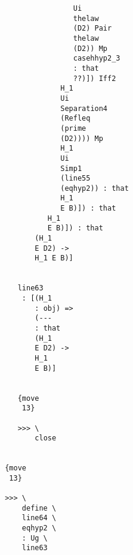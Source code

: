 \documentclass[12pt]{article}
\begin{document}
\begin{verbatim}
                                                       Ui 
                                                       thelaw 
                                                       (D2) Pair 
                                                       thelaw 
                                                       (D2)) Mp 
                                                       casehhyp2_3 
                                                       : that 
                                                       ??)]) Iff2 
                                                    H_1 
                                                    Ui 
                                                    Separation4 
                                                    (Refleq 
                                                    (prime 
                                                    (D2)))) Mp 
                                                    H_1 
                                                    Ui 
                                                    Simp1 
                                                    (line55 
                                                    (eqhyp2)) : that 
                                                    H_1 
                                                    E B)]) : that 
                                                 H_1 
                                                 E B)]) : that 
                                              (H_1 
                                              E D2) -> 
                                              H_1 E B)]


                                          line63 
                                           : [(H_1 
                                              : obj) => 
                                              (--- 
                                              : that 
                                              (H_1 
                                              E D2) -> 
                                              H_1 
                                              E B)]


                                          {move 
                                           13}

                                          >>> \
                                              close


                                       {move 
                                        13}

                                       >>> \
                                           define \
                                           line64 \
                                           eqhyp2 \
                                           : Ug \
                                           line63



\end{verbatim}
\end{document}
